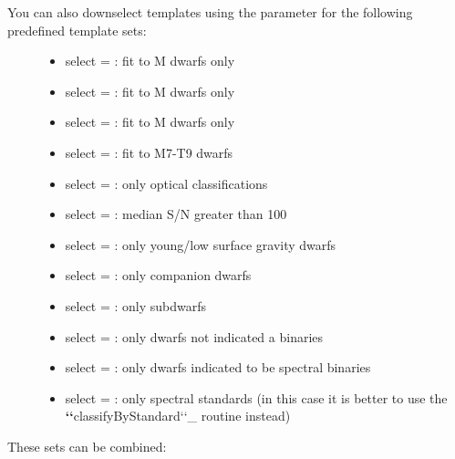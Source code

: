 \documentclass[letterpaper,10pt,english]{sphinxmanual}
\begin{document}
\begin{description}
\item[{You can also downselect templates using the  parameter for the following predefined template sets:}] \leavevmode\begin{itemize}
\item {} 
select = : fit to M dwarfs only

\item {} 
select = : fit to M dwarfs only

\item {} 
select = : fit to M dwarfs only

\item {} 
select = : fit to M7-T9 dwarfs

\item {} 
select = : only optical classifications

\item {} 
select = : median S/N greater than 100

\item {} 
select = : only young/low surface gravity dwarfs

\item {} 
select = : only companion dwarfs

\item {} 
select = : only subdwarfs

\item {} 
select = : only dwarfs not indicated a binaries

\item {} 
select = : only dwarfs indicated to be spectral binaries

\item {} 
select = : only spectral standards (in this case it is better to use the {\color{red}\bfseries{}{}`{}`}classifyByStandard{}`{}`\_ routine instead)

\end{itemize}

\end{description}

These sets can be combined:
\end{document}
